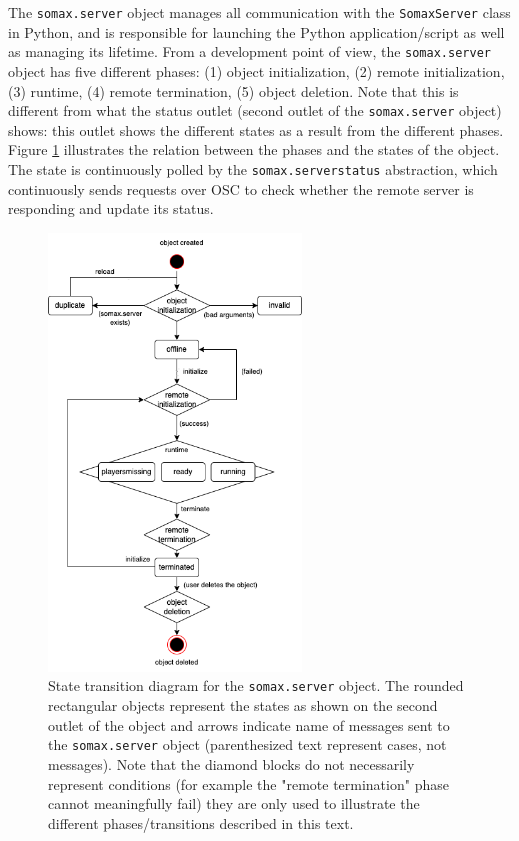 The \texttt{somax.server} object manages all communication with the \texttt{SomaxServer} class in Python, and is responsible for launching the Python application/script as well as managing its lifetime. From a development point of view, the \texttt{somax.server} object has five different phases: (1) object initialization, (2) remote initialization, (3) runtime, (4) remote termination, (5) object deletion. Note that this is different from what the status outlet (second outlet of the \texttt{somax.server} object) shows: this outlet shows the different states as a result from the different phases. Figure \ref{fig:3-server-states} illustrates the relation between the phases and the states of the object. The state is continuously polled by the \texttt{somax.serverstatus} abstraction, which continuously sends requests over OSC to check whether the remote server is responding and update its status.

 \begin{figure}[h!]
    \centering        
 	\includegraphics[width=0.6\textwidth, keepaspectratio]{figures/server_state.png}
    \caption{State transition diagram for the \texttt{somax.server} object. The rounded rectangular objects represent the states as shown on the second outlet of the object and arrows indicate name of messages sent to the \texttt{somax.server} object (parenthesized text represent cases, not messages). Note that the diamond blocks do not necessarily represent conditions (for example the "remote termination" phase cannot meaningfully fail) they are only used to illustrate the different phases/transitions described in this text.} 
    \label{fig:3-server-states}
\end{figure}

